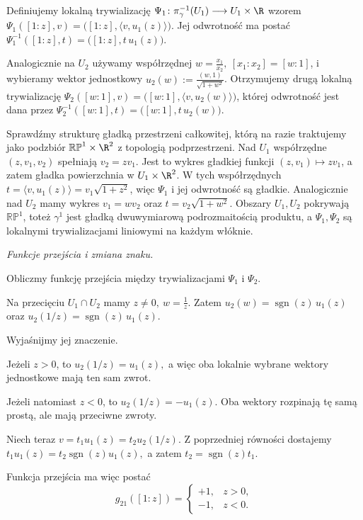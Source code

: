 \begin{przyklad}
Definiujemy lokalną trywializację
$
\Psi_1\colon
\pi_\gamma^{-1}(U_1)\longrightarrow U_1\times\R
$
wzorem $\Psi_1([1:z],v) = \bigl([1:z],\langle v,u_1(z)\rangle\bigr)$.
Jej odwrotność ma postać $\Psi_1^{-1}([1:z],t) = \bigl([1:z],t\,u_1(z)\bigr)$.

Analogicznie na $U_2$ używamy współrzędnej $w=\frac{x_1}{x_2}, \ [x_1:x_2]=[w:1]$,
i wybieramy wektor jednostkowy $u_2(w):=\frac{(w,1)}{\sqrt{1+w^2}}$.
Otrzymujemy drugą lokalną trywializację $\Psi_2([w:1],v) = \bigl([w:1],\langle v,u_2(w)\rangle\bigr)$,
której odwrotność jest dana przez $\Psi_2^{-1}([w:1],t) = \bigl([w:1],t\,u_2(w)\bigr)$.

Sprawdźmy strukturę gładką przestrzeni całkowitej,
którą na razie traktujemy jako podzbiór
$\mathbb{RP}^1\times\R^2$ z topologią podprzestrzeni.
Nad $U_1$ współrzędne $(z,v_1,v_2)$ spełniają
$v_2=zv_1$. Jest to wykres gładkiej funkcji
$(z,v_1)\mapsto zv_1$, a zatem gładka powierzchnia
w $U_1\times\R^2$. W tych współrzędnych
$t=\langle v,u_1(z)\rangle=v_1\sqrt{1+z^2}$,
więc $\Psi_1$ i jej odwrotność są gładkie.
Analogicznie nad $U_2$ mamy wykres $v_1=wv_2$
oraz $t=v_2\sqrt{1+w^2}$. Obszary $U_1,U_2$
pokrywają $\mathbb{RP}^1$, toteż $\gamma^1$
jest gładką dwuwymiarową podrozmaitością produktu,
a $\Psi_1,\Psi_2$ są lokalnymi trywializacjami
liniowymi na każdym włóknie.

\medskip
\emph{Funkcje przejścia i zmiana znaku.}

Obliczmy funkcję przejścia między
trywializacjami $\Psi_1$ i $\Psi_2$.

Na przecięciu $U_1\cap U_2$ mamy $z\neq0, \ w=\frac1z$.
Zatem
$
u_2(w)=\operatorname{sgn}(z)\,u_1(z)
$
oraz
$
u_2(1/z)=\operatorname{sgn}(z)\,u_1(z).
$

Wyjaśnijmy jej znaczenie.

Jeżeli $z>0$, to
$
u_2(1/z)=u_1(z),
$
a więc oba lokalnie wybrane wektory jednostkowe
mają ten sam zwrot.

Jeżeli natomiast $z<0$, to
$
u_2(1/z)=-u_1(z).
$
Oba wektory rozpinają tę samą prostą,
ale mają przeciwne zwroty.

Niech teraz
$
v=t_1u_1(z)=t_2u_2(1/z).
$
Z poprzedniej równości dostajemy
$
t_1u_1(z)
=
t_2\operatorname{sgn}(z)u_1(z),
$
a zatem
$
t_2=\operatorname{sgn}(z)t_1.
$

Funkcja przejścia ma więc postać
\[
\boxed{
g_{21}([1:z])
=
\begin{cases}
+1,&z>0,\\
-1,&z<0.
\end{cases}
}
\]


\end{przyklad}
